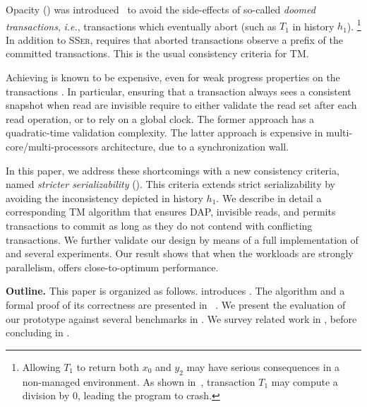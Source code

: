 Opacity (\opa) was introduced~\cite{guerraoui2008correctness} to avoid the side-effects of so-called \emph{doomed transactions}, \emph{i.e.}, transactions which eventually abort (such as $T_1$ in history $h_1$).%
\footnote{  
  Allowing $T_1$ to return both $x_0$ and $y_2$ may have serious consequences in a non-managed environment.
  As shown in~\cite{guerraoui2008correctness}, transaction $T_1$ may compute a division by $0$, leading the program to crash.
}
In addition to \textsc{SSer}, \opa requires that aborted transactions observe a prefix of the committed transactions.
This is the usual consistency criteria for TM.

Achieving \opa is known to be expensive, even for weak progress properties on the transactions \cite{}.
In particular, ensuring that a transaction always sees a consistent snapshot when read are invisible require to either validate the read set after each read operation, or to rely on a global clock.
The former approach has a quadratic-time validation complexity.
The latter approach is expensive in multi-core/multi-processors architecture, due to a synchronization wall.

In this paper, we address these shortcomings with a new consistency criteria, named \emph{stricter serializability} (\sser).
This criteria extends strict serializability by avoiding the inconsistency depicted in history $h_1$.
We describe in detail a corresponding TM algorithm that ensures DAP, invisible reads, and permits transactions to commit as long as they do not contend with conflicting transactions.
We further validate our design by means of a full implementation of \sser and several experiments.
Our result shows that when the workloads are strongly parallelism, \sser offers close-to-optimum performance.

\textbf{Outline.}
This paper is organized as follows.
 introduces \sser.
The algorithm and a formal proof of its correctness are presented in ~.
We present the evaluation of our prototype against several benchmarks in .
We survey related work in , before concluding in .
